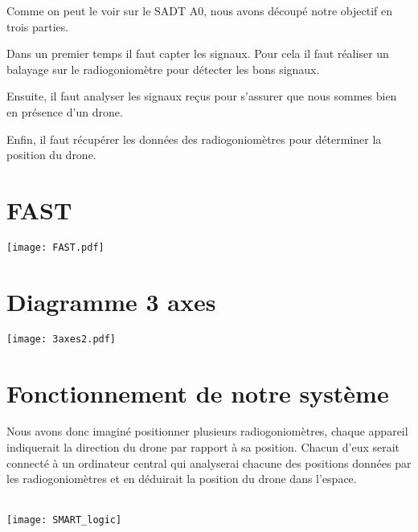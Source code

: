 \newpage
\parindent=15pt

Comme on peut le voir sur le SADT A0, nous avons découpé notre objectif en trois parties.

Dans un premier temps il faut capter les signaux. Pour cela il faut réaliser un balayage sur le radiogoniomètre pour détecter les bons signaux.

Ensuite, il faut analyser les signaux reçus pour s'assurer que nous sommes bien en présence d'un drone.

Enfin, il faut récupérer les données des radiogoniomètres pour déterminer la position du drone.


\section{FAST}

\hspace{-1.5cm}
\texttt{[image: FAST.pdf]}


\section{Diagramme 3 axes}

\hspace{-1.5cm}
\texttt{[image: 3axes2.pdf]}
\parindent=15pt

\section{Fonctionnement de notre système}

Nous avons donc imaginé positionner plusieurs radiogoniomètres, chaque appareil indiquerait la direction du drone par rapport à sa position. Chacun d'eux serait connecté à un ordinateur central qui analyserai chacune des positions données par les radiogoniomètres et en déduirait la position du drone dans l'espace.

~\\

\texttt{[image: SMART\_logic]}




